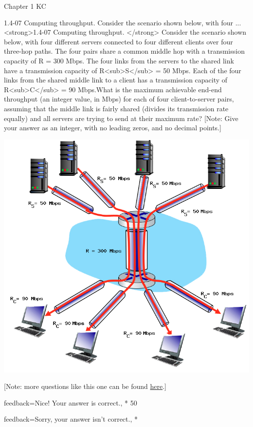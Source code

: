 \documentclass[a4paper]{article}
\begin{document}
\begin{quiz}{Chapter 1 KC}
\begin{shortanswer}[points=1]{1.4-07 Computing throughput.  Consider the scenario shown below, with four ...}
<strong>1.4-07 Computing throughput. </strong> Consider the scenario shown below, with four different servers connected to four different clients over four three-hop paths. The four pairs share a common middle hop with a transmission capacity of R = 300 Mbps. The four links from the servers to the shared link have a transmission capacity of R<sub>S</sub> = 50 Mbps. Each of the four links from the shared middle link to a client has a transmission capacity of R<sub>C</sub> = 90 Mbps.What is the maximum achievable end-end throughput (an integer value, in Mbps) for each of four client-to-server pairs, assuming that the middle link is fairly shared (divides its transmission rate equally) and all servers are trying to send at their maximum rate? [Note: Give your answer as an integer, with no leading zeros, and no decimal points.] 
\begin{center}
\includegraphics[width=\linewidth]{figs/1.4.7.png}
\end{center}
 [Note: more questions like this one can be found \href{http://gaia.cs.umass.edu/kurose_ross/interactive/end-end-throughput-simple.php}{here}.]
\item[feedback={Nice!  Your answer is correct.},]* 50
\item[feedback={Sorry, your answer isn't correct.},] *
\end{shortanswer}


\end{quiz}
\end{document}

